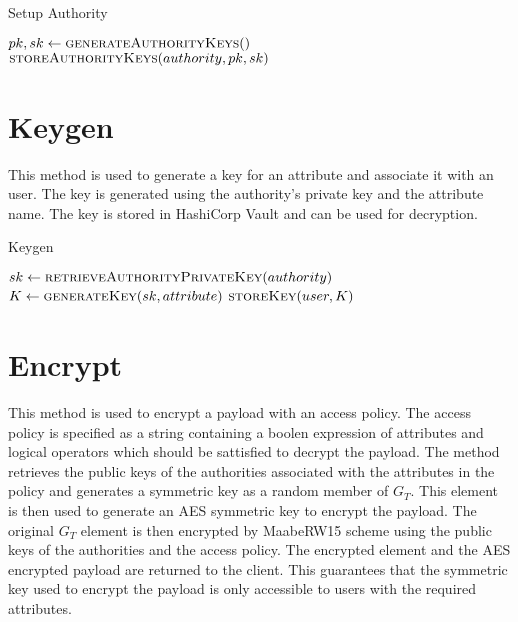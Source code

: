 \begin{algorithm}
    \caption{Setup Authority}
    \label{alg:setup_authority}
    \begin{algorithmic}[1]
        \State $pk, sk \gets \textsc{generateAuthorityKeys}()$
        \State $\textsc{storeAuthorityKeys}(authority, pk, sk)$
    \EndProcedure
    \end{algorithmic}
\end{algorithm}

\section{Keygen}
This method is used to generate a key for an attribute and associate it with an user. The key is generated using the authority's private key and the attribute name. The key is stored in HashiCorp Vault and can be used for decryption.

\begin{algorithm}
    \caption{Keygen}
    \label{alg:keygen}
    \begin{algorithmic}[1]
        \State $sk \gets \textsc{retrieveAuthorityPrivateKey}(authority)$
        \State $K \gets \textsc{generateKey}(sk, attribute)$
        \State $\textsc{storeKey}(user, K)$
    \EndProcedure
    \end{algorithmic}
\end{algorithm}


\section{Encrypt}
This method is used to encrypt a payload with an access policy. The access policy is specified as a string containing a boolen expression of attributes and logical operators which should be sattisfied to decrypt the payload. The method retrieves the public keys of the authorities associated with the attributes in the policy and generates a symmetric key as a random member of $G_T$. This element is then used to generate an AES symmetric key to encrypt the payload. The original $G_T$ element is then encrypted by MaabeRW15 scheme using the public keys of the authorities and the access policy. The encrypted element and the AES encrypted payload are returned to the client. This guarantees that the symmetric key used to encrypt the payload is only accessible to users with the required attributes.

